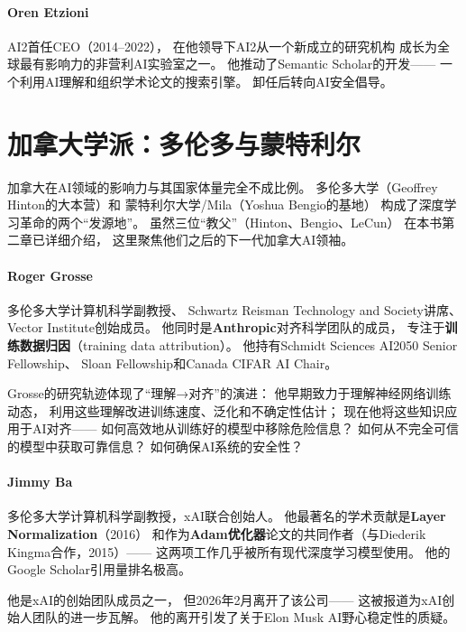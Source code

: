 \paragraph{Oren Etzioni}
AI2首任CEO（2014--2022），
在他领导下AI2从一个新成立的研究机构
成长为全球最有影响力的非营利AI实验室之一。
他推动了Semantic Scholar的开发——
一个利用AI理解和组织学术论文的搜索引擎。
卸任后转向AI安全倡导。


\section{加拿大学派：多伦多与蒙特利尔}
\label{sec:canada}

加拿大在AI领域的影响力与其国家体量完全不成比例。
多伦多大学（Geoffrey Hinton的大本营）和
蒙特利尔大学/Mila（Yoshua Bengio的基地）
构成了深度学习革命的两个``发源地''。
虽然三位``教父''（Hinton、Bengio、LeCun）
在本书第二章已详细介绍，
这里聚焦他们之后的下一代加拿大AI领袖。

\paragraph{Roger Grosse}
多伦多大学计算机科学副教授、
Schwartz Reisman Technology and Society讲席、
Vector Institute创始成员。
他同时是\textbf{Anthropic}对齐科学团队的成员，
专注于\textbf{训练数据归因}（training data attribution）。
他持有Schmidt Sciences AI2050 Senior Fellowship、
Sloan Fellowship和Canada CIFAR AI Chair。

Grosse的研究轨迹体现了``理解→对齐''的演进：
他早期致力于理解神经网络训练动态，
利用这些理解改进训练速度、泛化和不确定性估计；
现在他将这些知识应用于AI对齐——
如何高效地从训练好的模型中移除危险信息？
如何从不完全可信的模型中获取可靠信息？
如何确保AI系统的安全性？

\paragraph{Jimmy Ba}
多伦多大学计算机科学副教授，xAI联合创始人。
他最著名的学术贡献是\textbf{Layer Normalization}（2016）
和作为\textbf{Adam优化器}论文的共同作者（与Diederik Kingma合作，2015）——
这两项工作几乎被所有现代深度学习模型使用。
他的Google Scholar引用量排名极高。

他是xAI的创始团队成员之一，
但2026年2月离开了该公司——
这被报道为xAI创始人团队的进一步瓦解。
他的离开引发了关于Elon Musk AI野心稳定性的质疑。

